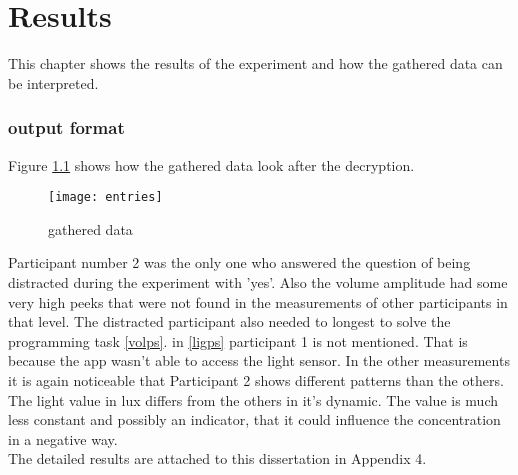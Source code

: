 \chapter{Results}
This chapter shows the results of the experiment and how the gathered data can be interpreted. 


\subsection{output format}
Figure \ref{entries} shows how the gathered data look after the decryption. 

\begin{figure}[!htb]
\centering
\texttt{[image: entries]}
\caption{gathered data}\label{entries}
\vspace{10 mm}
\end{figure}

\FloatBarrier

Participant number 2 was the only one who answered the question of being distracted during the experiment with 'yes'. Also the volume amplitude had some very high peeks that were not found in the measurements of other participants in that level. The distracted participant also needed to longest to solve the programming task \ref{volps}. 
\bigbreak
in \ref{ligps} participant 1 is not mentioned. That is because the app wasn't able to access the light sensor. In the other measurements it is again noticeable that Participant 2 shows different patterns than the others. The light value in lux differs from the others in it's dynamic. The value is much less constant and possibly an indicator, that it could influence the concentration in a negative way.\\
The detailed results are attached to this dissertation in Appendix 4.

